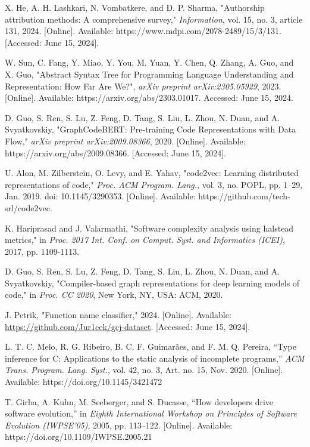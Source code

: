 \documentclass[conference]{IEEEtran}
\begin{document}
\begin{thebibliography}{00}
    X. He, A. H. Lashkari, N. Vombatkere, and D. P. Sharma, "Authorship attribution methods: A comprehensive survey," \textit{Information}, vol. 15, no. 3, article 131, 2024. [Online]. Available: https://www.mdpi.com/2078-2489/15/3/131. [Accessed: June 15, 2024].
    
    W. Sun, C. Fang, Y. Miao, Y. You, M. Yuan, Y. Chen, Q. Zhang, A. Guo, and X. Guo, "Abstract Syntax Tree for Programming Language Understanding and Representation: How Far Are We?", \textit{arXiv preprint arXiv:2305.05929}, 2023. [Online]. Available: https://arxiv.org/abs/2303.01017. Accessed: June 15, 2024.
    
    D. Guo, S. Ren, S. Lu, Z. Feng, D. Tang, S. Liu, L. Zhou, N. Duan, and A. Svyatkovskiy, "GraphCodeBERT: Pre-training Code Representations with Data Flow," \textit{arXiv preprint arXiv:2009.08366}, 2020. [Online]. Available: https://arxiv.org/abs/2009.08366. [Accessed: June 15, 2024].
    
    U. Alon, M. Zilberstein, O. Levy, and E. Yahav, "code2vec: Learning distributed representations of code," \textit{Proc. ACM Program. Lang.}, vol. 3, no. POPL, pp. 1–29, Jan. 2019. doi: 10.1145/3290353. [Online]. Available: https://github.com/tech-srl/code2vec.
    
    K. Hariprasad and J. Valarmathi, "Software complexity analysis using halstead metrics," in \textit{Proc. 2017 Int. Conf. on Comput. Syst. and Informatics (ICEI)}, 2017, pp. 1109-1113.
    
    D. Guo, S. Ren, S. Lu, Z. Feng, D. Tang, S. Liu, L. Zhou, N. Duan, and A. Svyatkovskiy, "Compiler-based graph representations for deep learning models of code," in \textit{Proc. CC 2020}, New York, NY, USA: ACM, 2020.
    
    J. Petrik, "Function name classifier," 2024. [Online]. Available: \url{https://github.com/Jur1cek/gcj-dataset}. [Accessed: June 15, 2024].
    
    L. T. C. Melo, R. G. Ribeiro, B. C. F. Guimarães, and F. M. Q. Pereira, ``Type inference for C: Applications to the static analysis of incomplete programs,'' \textit{ACM Trans. Program. Lang. Syst.}, vol. 42, no. 3, Art. no. 15, Nov. 2020. [Online]. Available: https://doi.org/10.1145/3421472

    T. Girba, A. Kuhn, M. Seeberger, and S. Ducasse, ``How developers drive software evolution,'' in \textit{Eighth International Workshop on Principles of Software Evolution (IWPSE'05)}, 2005, pp. 113--122. [Online]. Available: https://doi.org/10.1109/IWPSE.2005.21


\end{thebibliography}
\end{document}
